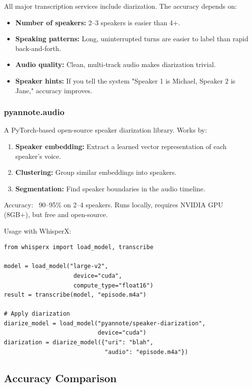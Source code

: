 \documentclass[11pt,letterpaper]{article}
\begin{document}
All major transcription services include diarization. The accuracy depends on:

\begin{itemize}
  \item \textbf{Number of speakers:} 2–3 speakers is easier than 4+.
  \item \textbf{Speaking patterns:} Long, uninterrupted turns are easier to label than rapid back-and-forth.
  \item \textbf{Audio quality:} Clean, multi-track audio makes diarization trivial.
  \item \textbf{Speaker hints:} If you tell the system "Speaker 1 is Michael, Speaker 2 is Jane," accuracy improves.
\end{itemize}

\subsubsection{pyannote.audio}

A PyTorch-based open-source speaker diarization library. Works by:

\begin{enumerate}
  \item \textbf{Speaker embedding:} Extract a learned vector representation of each speaker's voice.
  \item \textbf{Clustering:} Group similar embeddings into speakers.
  \item \textbf{Segmentation:} Find speaker boundaries in the audio timeline.
\end{enumerate}

Accuracy: ~90–95\% on 2–4 speakers. Runs locally, requires NVIDIA GPU (8GB+), but free and open-source.

Usage with WhisperX:

\begin{verbatim}
from whisperx import load_model, transcribe

model = load_model("large-v2",
                    device="cuda",
                    compute_type="float16")
result = transcribe(model, "episode.m4a")

# Apply diarization
diarize_model = load_model("pyannote/speaker-diarization",
                           device="cuda")
diarization = diarize_model({"uri": "blah",
                             "audio": "episode.m4a"})
\end{verbatim}

\subsection{Accuracy Comparison}
\end{document}
